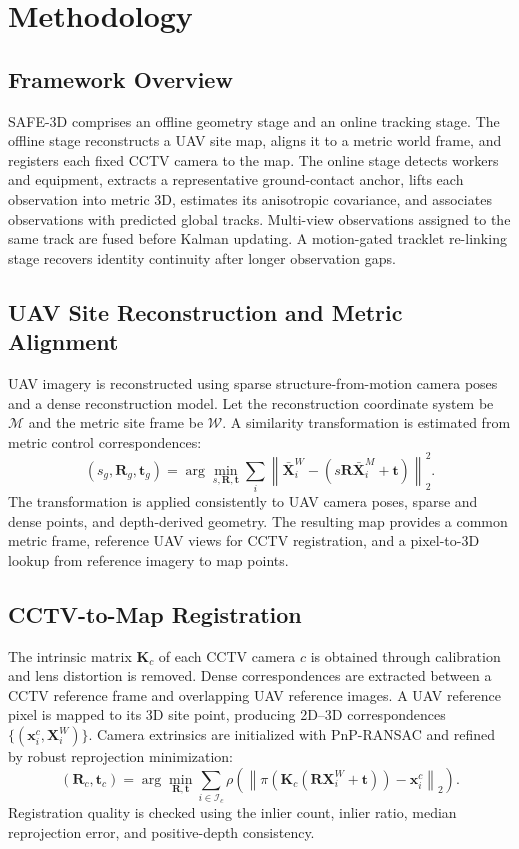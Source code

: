 \section{Methodology}
\label{sec:method}

\subsection{Framework Overview}
SAFE-3D comprises an offline geometry stage and an online tracking stage. The offline stage reconstructs a UAV site map, aligns it to a metric world frame, and registers each fixed CCTV camera to the map. The online stage detects workers and equipment, extracts a representative ground-contact anchor, lifts each observation into metric 3D, estimates its anisotropic covariance, and associates observations with predicted global tracks. Multi-view observations assigned to the same track are fused before Kalman updating. A motion-gated tracklet re-linking stage recovers identity continuity after longer observation gaps.

\subsection{UAV Site Reconstruction and Metric Alignment}
UAV imagery is reconstructed using sparse structure-from-motion camera poses and a dense reconstruction model. Let the reconstruction coordinate system be $\mathcal{M}$ and the metric site frame be $\mathcal{W}$. A similarity transformation is estimated from metric control correspondences:
\begin{equation}
(s_g,\mathbf{R}_g,\mathbf{t}_g)=\arg\min_{s,\mathbf{R},\mathbf{t}}\sum_i\left\|\bar{\mathbf{X}}_i^{W}-(s\mathbf{R}\bar{\mathbf{X}}_i^{M}+\mathbf{t})\right\|_2^2.
\end{equation}
The transformation is applied consistently to UAV camera poses, sparse and dense points, and depth-derived geometry. The resulting map provides a common metric frame, reference UAV views for CCTV registration, and a pixel-to-3D lookup from reference imagery to map points.

\subsection{CCTV-to-Map Registration}
The intrinsic matrix $\mathbf{K}_c$ of each CCTV camera $c$ is obtained through calibration and lens distortion is removed. Dense correspondences are extracted between a CCTV reference frame and overlapping UAV reference images. A UAV reference pixel is mapped to its 3D site point, producing 2D--3D correspondences $\{(\mathbf{x}_{i}^{c},\mathbf{X}_{i}^{W})\}$. Camera extrinsics are initialized with PnP-RANSAC and refined by robust reprojection minimization:
\begin{equation}
(\mathbf{R}_c,\mathbf{t}_c)=\arg\min_{\mathbf{R},\mathbf{t}}\sum_{i\in\mathcal{I}_c}\rho\!\left(\left\|\pi\!\left(\mathbf{K}_c(\mathbf{R}\mathbf{X}_i^W+\mathbf{t})\right)-\mathbf{x}_i^c\right\|_2\right).
\end{equation}
Registration quality is checked using the inlier count, inlier ratio, median reprojection error, and positive-depth consistency.

